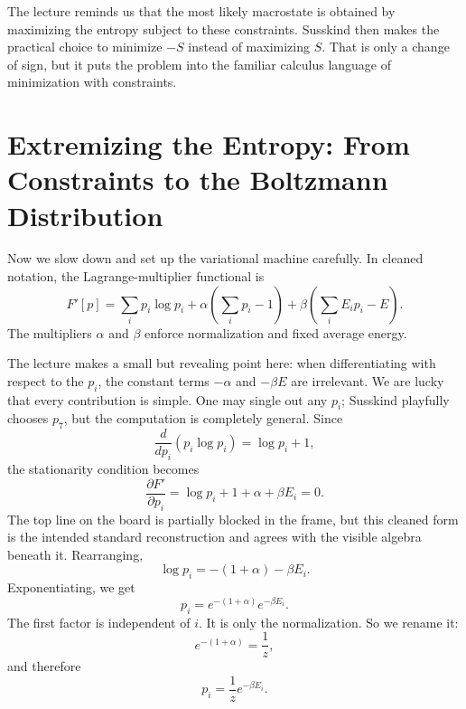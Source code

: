 The lecture reminds us that the most likely macrostate is obtained by maximizing the entropy subject to these constraints. Susskind then makes the practical choice to minimize \(-S\) instead of maximizing \(S\). That is only a change of sign, but it puts the problem into the familiar calculus language of minimization with constraints.

\section{Extremizing the Entropy: From Constraints to the Boltzmann Distribution}

Now we slow down and set up the variational machine carefully. In cleaned notation, the Lagrange-multiplier functional is
\begin{equation}
F'[p]
=
\sum_i p_i\log p_i
+
\alpha\left(\sum_i p_i-1\right)
+
\beta\left(\sum_i E_i p_i-E\right).
\end{equation}
The multipliers \(\alpha\) and \(\beta\) enforce normalization and fixed average energy.

The lecture makes a small but revealing point here: when differentiating with respect to the \(p_i\), the constant terms \(-\alpha\) and \(-\beta E\) are irrelevant. We are lucky that every contribution is simple. One may single out any \(p_i\); Susskind playfully chooses \(p_7\), but the computation is completely general. Since
\begin{equation}
\frac{d}{dp_i}(p_i\log p_i)=\log p_i+1,
\end{equation}
the stationarity condition becomes
\begin{equation}
\frac{\partial F'}{\partial p_i}
=
\log p_i+1+\alpha+\beta E_i
=
0.
\end{equation}
The top line on the board is partially blocked in the frame, but this cleaned form is the intended standard reconstruction and agrees with the visible algebra beneath it. Rearranging,
\begin{equation}
\log p_i = -(1+\alpha)-\beta E_i.
\end{equation}
Exponentiating, we get
\begin{equation}
p_i=e^{-(1+\alpha)}e^{-\beta E_i}.
\end{equation}
The first factor is independent of \(i\). It is only the normalization. So we rename it:
\begin{equation}
e^{-(1+\alpha)}=\frac{1}{z},
\end{equation}
and therefore
\begin{equation}
p_i=\frac{1}{z}e^{-\beta E_i}.
\end{equation}

